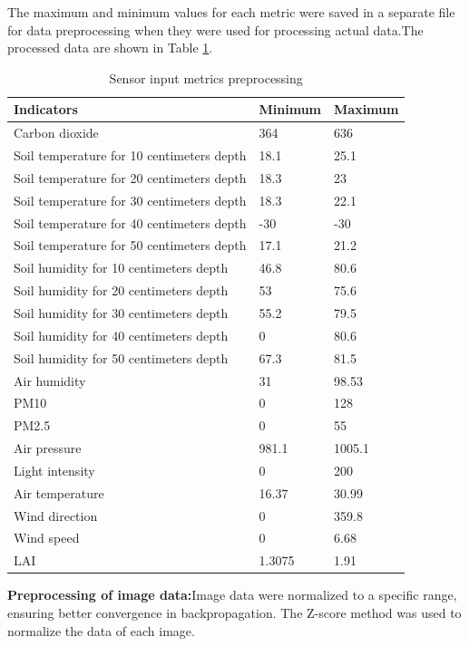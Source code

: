 \documentclass[acmsmall,manuscript, screen, review]{acmart}
\begin{document}
The maximum and minimum values for each metric were saved in a separate file for data preprocessing when they were used for processing actual data.The processed data are shown in Table \ref{tab:sensor_input_metrics_preprocessing}.


\begin{table}
  \caption{Sensor input metrics preprocessing \label{tab:sensor_input_metrics_preprocessing}}

  \begin{tabular}{lll}
    \hline
    \multicolumn{1}{l}{Indicators} & \multicolumn{1}{l}{Minimum} & \multicolumn{1}{l}{Maximum} \\
    \hline
    Carbon dioxide & 364   & 636 \\
    Soil temperature for 10 centimeters depth & 18.1  & 25.1 \\
    Soil temperature for 20 centimeters depth & 18.3  & 23 \\
    Soil temperature for 30 centimeters depth & 18.3  & 22.1 \\
    Soil temperature for 40 centimeters depth & -30   & -30 \\
    Soil temperature for 50 centimeters depth & 17.1  & 21.2 \\
    Soil humidity for 10 centimeters depth & 46.8  & 80.6 \\
    Soil humidity for 20 centimeters depth & 53    & 75.6 \\
    Soil humidity for 30 centimeters depth & 55.2  & 79.5 \\
    Soil humidity for 40 centimeters depth & 0     & 80.6 \\
    Soil humidity for 50 centimeters depth & 67.3  & 81.5 \\
    Air humidity & 31    & 98.53 \\
    PM10  & 0     & 128 \\
    PM2.5 & 0     & 55 \\
    Air pressure & 981.1 & 1005.1 \\
    Light intensity & 0     & 200 \\
    Air temperature & 16.37 & 30.99 \\
    Wind direction & 0     & 359.8 \\
    Wind speed & 0     & 6.68 \\
    LAI   & 1.3075 & 1.91 \\
    \hline
    \end{tabular}%
\end{table}
\textbf{Preprocessing of image data:}Image data were normalized to a specific range, ensuring better convergence in backpropagation. The Z-score method was used to normalize the data of each image.
\end{document}
